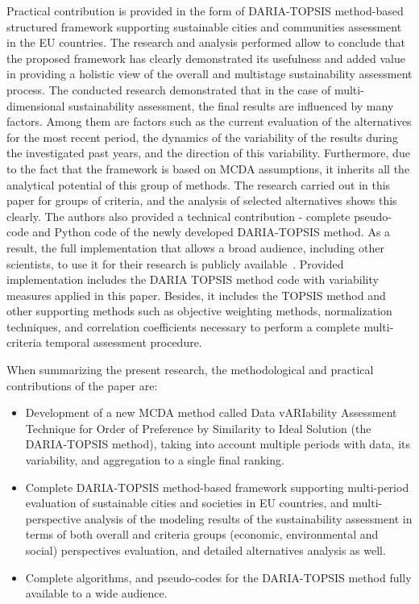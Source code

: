 \documentclass[5p,times]{elsarticle}
\begin{document}
Practical contribution is provided in the form of DARIA-TOPSIS method-based structured framework supporting sustainable cities and communities assessment in the EU countries. The research and analysis performed allow to conclude that the proposed framework has clearly demonstrated its usefulness and added value in providing a holistic view of the overall and multistage sustainability assessment process. The conducted research demonstrated that in the case of multi-dimensional sustainability assessment, the final results are influenced by many factors. Among them are factors such as the current evaluation of the alternatives for the most recent period, the dynamics of the variability of the results during the investigated past years, and the direction of this variability. Furthermore, due to the fact that the framework is based on MCDA assumptions, it inherits all the analytical potential of this group of methods. The research carried out in this paper for groups of criteria, and the analysis of selected alternatives shows this clearly. The authors also provided a technical contribution - complete pseudo-code and Python code of the newly developed DARIA-TOPSIS method. As a result, the full implementation that allows a broad audience, including other scientists, to use it for their research is publicly available~\cite{dariagithub2022}. Provided implementation includes the DARIA TOPSIS method code with variability measures applied in this paper. Besides, it includes the TOPSIS method and other supporting methods such as objective weighting methods, normalization techniques, and correlation coefficients necessary to perform a complete multi-criteria temporal assessment procedure.    

When summarizing the present research, the methodological and practical contributions of the paper are: 

\begin{itemize}
    \item {Development of a new MCDA method called Data vARIability Assessment Technique for Order of Preference by Similarity to Ideal Solution (the DARIA-TOPSIS method), taking into account multiple periods with data, its variability, and aggregation to a single final ranking.}
    \item {Complete DARIA-TOPSIS method-based framework supporting multi-period evaluation of sustainable cities and societies in EU countries, and multi-perspective analysis of the modeling results of the sustainability assessment in terms of both overall and criteria groups (economic, environmental and social) perspectives evaluation, and detailed alternatives analysis as well.}
    \item {Complete algorithms, and pseudo-codes for the DARIA-TOPSIS method fully available to a wide audience.}
\end{itemize}
\end{document}
